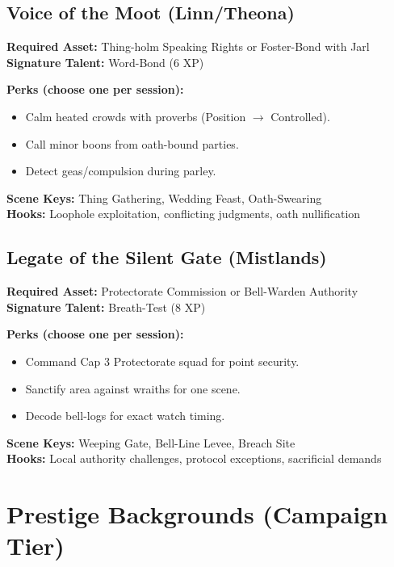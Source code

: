 \subsection{Voice of the Moot (Linn/Theona)}
\label{subsec:voice-moot}

\textbf{Required Asset:} Thing-holm Speaking Rights or Foster-Bond with Jarl\\
\textbf{Signature Talent:} Word-Bond (6 XP)

\textbf{Perks (choose one per session):}
\begin{itemize}
\item Calm heated crowds with proverbs (Position $\rightarrow$ Controlled).
\item Call minor boons from oath-bound parties.
\item Detect geas/compulsion during parley.
\end{itemize}

\textbf{Scene Keys:} Thing Gathering, Wedding Feast, Oath-Swearing\\
\textbf{Hooks:} Loophole exploitation, conflicting judgments, oath nullification

\subsection{Legate of the Silent Gate (Mistlands)}
\label{subsec:legate-gate}

\textbf{Required Asset:} Protectorate Commission or Bell-Warden Authority\\
\textbf{Signature Talent:} Breath-Test (8 XP)

\textbf{Perks (choose one per session):}
\begin{itemize}
\item Command Cap 3 Protectorate squad for point security.
\item Sanctify area against wraiths for one scene.
\item Decode bell-logs for exact watch timing.
\end{itemize}

\textbf{Scene Keys:} Weeping Gate, Bell-Line Levee, Breach Site\\
\textbf{Hooks:} Local authority challenges, protocol exceptions, sacrificial demands

\section{Prestige Backgrounds (Campaign Tier)}
\label{sec:prestige-backgrounds}

